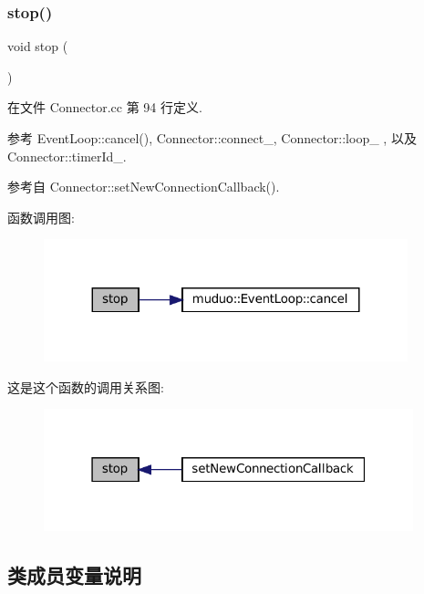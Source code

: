 \subsubsection{\texorpdfstring{stop()}{stop()}}
{\footnotesize\ttfamily void stop (\begin{DoxyParamCaption}{ }\end{DoxyParamCaption})}



在文件 Connector.\+cc 第 94 行定义.



参考 Event\+Loop\+::cancel(), Connector\+::connect\+\_\+, Connector\+::loop\+\_\+ , 以及 Connector\+::timer\+Id\+\_\+.



参考自 Connector\+::set\+New\+Connection\+Callback().

函数调用图\+:
\nopagebreak
\begin{figure}[H]
\begin{center}
\leavevmode
\includegraphics[width=299pt]{classmuduo_1_1Connector_a8c528baf37154d347366083f0f816846_cgraph}
\end{center}
\end{figure}
这是这个函数的调用关系图\+:
\nopagebreak
\begin{figure}[H]
\begin{center}
\leavevmode
\includegraphics[width=304pt]{classmuduo_1_1Connector_a8c528baf37154d347366083f0f816846_icgraph}
\end{center}
\end{figure}


\subsection{类成员变量说明}
\mbox{\label{classmuduo_1_1Connector_a8375a127884b4155e4d0ff8604bb0b9a}} 
